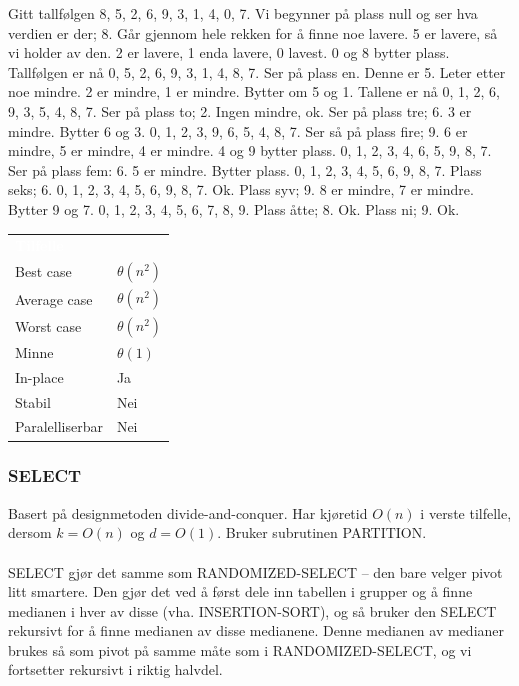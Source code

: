 \begin{boxed}
Gitt tallfølgen 8, 5, 2, 6, 9, 3, 1, 4, 0, 7. Vi begynner på plass null og ser hva verdien er der; 8. Går gjennom hele rekken for å finne noe lavere. 5 er lavere, så vi holder av den. 2 er lavere, 1 enda lavere, 0 lavest. 0 og 8 bytter plass. Tallfølgen er nå 0, 5, 2, 6, 9, 3, 1, 4, 8, 7. Ser på plass en. Denne er 5. Leter etter noe mindre. 2 er mindre, 1 er mindre. Bytter om 5 og 1. Tallene er nå 0, 1, 2, 6, 9, 3, 5, 4, 8, 7. Ser på plass to; 2. Ingen mindre, ok. Ser på plass tre; 6. 3 er mindre. Bytter 6 og 3. 0, 1, 2, 3, 9, 6, 5, 4, 8, 7. Ser så på plass fire; 9. 6 er mindre, 5 er mindre, 4 er mindre. 4 og 9 bytter plass. 0, 1, 2, 3, 4, 6, 5, 9, 8, 7. Ser på plass fem: 6. 5 er mindre. Bytter plass. 0, 1, 2, 3, 4, 5, 6, 9, 8, 7. Plass seks; 6. 0, 1, 2, 3, 4, 5, 6, 9, 8, 7. Ok. Plass syv; 9. 8 er mindre, 7 er mindre. Bytter 9 og 7. 0, 1, 2, 3, 4, 5, 6, 7, 8, 9. Plass åtte; 8. Ok. Plass ni; 9. Ok.
\end{boxed}

\begin{table}[H]
    \label{tab:selectionsort}
    \centering
    \begin{tabular}{|L{15em} | L{15em}|}
        \hline
        \textbf{\textcolor{white}{Tilfelle}} & \textbf{\textcolor{white}{}}\\
        Best case & $\theta(n^2)$\\
        Average case & $\theta(n^2)$\\
        Worst case & $\theta(n^2)$\\
        Minne & $\theta(1)$\\
        In-place & Ja\\
        Stabil & Nei\\
        Paralelliserbar & Nei\\
         \hline
    \end{tabular}
\end{table}

\subsubsection{SELECT}
Basert på designmetoden divide-and-conquer. Har kjøretid $O(n)$ i verste tilfelle, dersom $k = O(n)$ og $d = O(1)$. Bruker subrutinen PARTITION.
\\\\
SELECT gjør det samme som RANDOMIZED-SELECT – den bare velger pivot litt smartere. Den gjør det ved å først dele inn tabellen i grupper og å finne medianen i hver av disse (vha. INSERTION-SORT), og så bruker den SELECT rekursivt for å finne medianen av disse medianene. Denne medianen av medianer brukes så som pivot på samme måte som i RANDOMIZED-SELECT, og vi fortsetter rekursivt i riktig halvdel.


